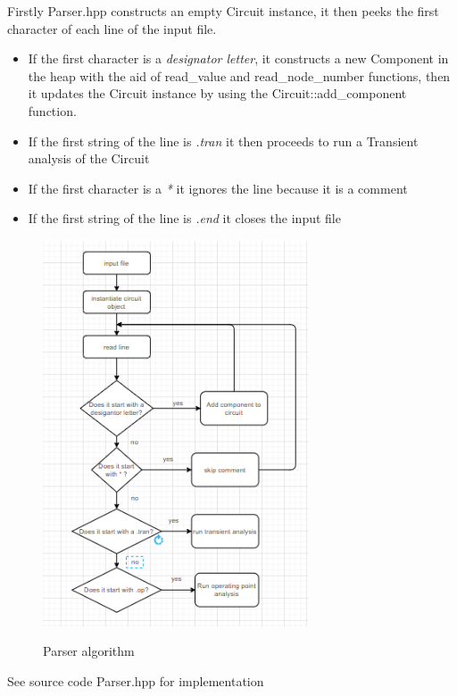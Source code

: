 \documentclass{article}
\begin{document}
Firstly Parser.hpp constructs an empty Circuit instance, it then peeks the first character of each line of the input file.
\begin{itemize}
\item If the first character is a \textit{designator letter}, it constructs a new Component in the heap with the aid of read\_value and read\_node\_number functions, then it updates the Circuit instance by using the Circuit::add\_component function.
\item If the first string of the line is \textit{.tran} it then proceeds to run a Transient analysis of the Circuit
\item If the first character is a \textit{*} it ignores the line because it is a comment
\item If the first string of the line is \textit{.end} it closes the input file
\end{itemize}

\begin{figure}[h]
    \caption{Parser algorithm}
    \centering
    \includegraphics[width=0.7\textwidth]{images/Parser_flowchart.PNG}
    \label{fig:ParserFlowchart}
\end{figure}

\bigbreak
See source code Parser.hpp for implementation
\end{document}
